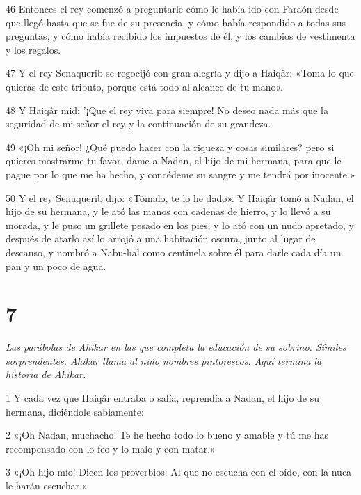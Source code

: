 \par 46 Entonces el rey comenzó a preguntarle cómo le había ido con Faraón desde que llegó hasta que se fue de su presencia, y cómo había respondido a todas sus preguntas, y cómo había recibido los impuestos de él, y los cambios de vestimenta y los regalos.

\par 47 Y el rey Senaquerib se regocijó con gran alegría y dijo a Haiqâr: «Toma lo que quieras de este tributo, porque está todo al alcance de tu mano».

\par 48 Y Haiqâr mid: '¡Que el rey viva para siempre! No deseo nada más que la seguridad de mi señor el rey y la continuación de su grandeza.

\par 49 «¡Oh mi señor! ¿Qué puedo hacer con la riqueza y cosas similares? pero si quieres mostrarme tu favor, dame a Nadan, el hijo de mi hermana, para que le pague por lo que me ha hecho, y concédeme su sangre y me tendrá por inocente.»

\par 50 Y el rey Senaquerib dijo: «Tómalo, te lo he dado». Y Haiqâr tomó a Nadan, el hijo de su hermana, y le ató las manos con cadenas de hierro, y lo llevó a su morada, y le puso un grillete pesado en los pies, y lo ató con un nudo apretado, y después de atarlo así lo arrojó a una habitación oscura, junto al lugar de descanso, y nombró a Nabu-hal como centinela sobre él para darle cada día un pan y un poco de agua.

\chapter{7}

\par \textit{Las parábolas de Ahikar en las que completa la educación de su sobrino. Símiles sorprendentes. Ahikar llama al niño nombres pintorescos. Aquí termina la historia de Ahikar.}

\par 1 Y cada vez que Haiqâr entraba o salía, reprendía a Nadan, el hijo de su hermana, diciéndole sabiamente:

\par 2 «¡Oh Nadan, muchacho! Te he hecho todo lo bueno y amable y tú me has recompensado con lo feo y lo malo y con matar.»

\par 3 «¡Oh hijo mío! Dicen los proverbios: Al que no escucha con el oído, con la nuca le harán escuchar.»

